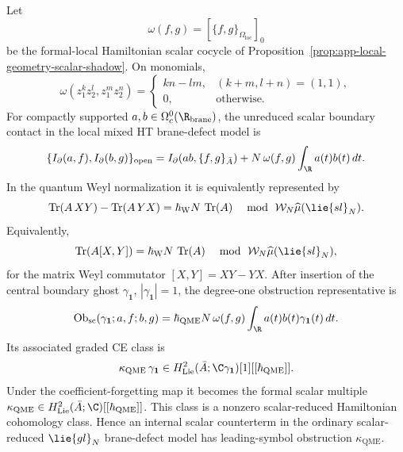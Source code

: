 \begin{thm}
\label{thm:app-scalar-contact-qme-class}
  Let
  \[
    \omega(f,g)=[\{f,g\}_{\Omega_{\mathrm{loc}}}]_0
  \]
  be the formal-local Hamiltonian scalar cocycle of
  Proposition~\ref{prop:app-local-geometry-scalar-shadow}.  On monomials,
  \[
    \omega(z_1^kz_2^l,z_1^mz_2^n)=
    \begin{cases}
      kn-lm,&(k+m,l+n)=(1,1),\\
      0,&\text{otherwise.}
    \end{cases}
  \]
  For compactly supported \(a,b\in\Omega^0_c(\R_{\mathrm{brane}})\), the
  unreduced scalar boundary contact in the local mixed HT brane-defect
  model is
  \[
    \{I_\partial(a,f),I_\partial(b,g)\}_{\mathrm{open}}
    =
    I_\partial(ab,\{f,g\}_{\bar A})
    +N\,\omega(f,g)\int_\R a(t)b(t)\,dt .
  \]
  In the quantum Weyl normalization it is equivalently represented by
  \[
    \operatorname{Tr}(A\,XY)-\operatorname{Tr}(A\,YX)
      =
      \hbar_{\mathrm{W}}N\,\operatorname{Tr}(A)
      \quad\bmod\ \mathcal W_N\widehat\mu(\lie{sl}_N).
  \]
  Equivalently,
  \[
    \operatorname{Tr}(A[X,Y])
      =\hbar_{\mathrm{W}}N\,\operatorname{Tr}(A)
      \quad\bmod\ \mathcal W_N\widehat\mu(\lie{sl}_N),
  \]
  for the matrix Weyl commutator \([X,Y]=XY-YX\).
  After insertion of the central boundary ghost
  \(\gamma_{\mathbf 1}\), \(|\gamma_{\mathbf 1}|=1\), the degree-one
  obstruction representative is
  \[
    \operatorname{Ob}_{\mathrm{sc}}(\gamma_{\mathbf 1};a,f;b,g)
    =
    \hbar_{\mathrm{QME}}N\,\omega(f,g)
    \int_\R a(t)b(t)\gamma_{\mathbf 1}(t)\,dt .
  \]
  Its associated graded CE class is
  \[
    \kappa_{\mathrm{QME}}\,\gamma_{\mathbf 1}
    \in H^2_{\mathrm{Lie}}(\bar A;\C\gamma_{\mathbf 1})[1]
      [[\hbar_{\mathrm{QME}}]].
  \]
  Under the coefficient-forgetting map it becomes the formal scalar
  multiple
  \(\kappa_{\mathrm{QME}}\in
  H^2_{\mathrm{Lie}}(\bar A;\C)[[\hbar_{\mathrm{QME}}]]\).  This
  class is a nonzero scalar-reduced Hamiltonian cohomology class.  Hence an
  internal scalar counterterm in the ordinary scalar-reduced
  \(\lie{gl}_N\) brane-defect model has leading-symbol obstruction
  \(\kappa_{\mathrm{QME}}\).
\end{thm}

